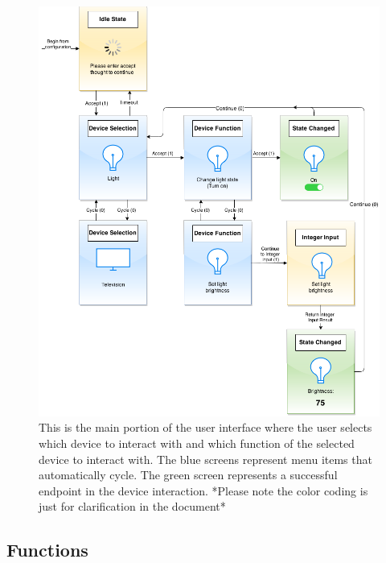 \documentclass{article}
\begin{document}
\begin{figure}
\includegraphics[width=\textwidth]{ApplicationUI_srs_final.png}

\caption{This is the main portion of the user interface where the user selects which device to interact with and which function of the selected device to interact with. The blue screens represent menu items that automatically cycle. The green screen represents a successful endpoint in the device interaction. *Please note the color coding is just for clarification in the document*}
\label{fig:mockup}
\end{figure}

\subsection{Functions}

\end{document}
